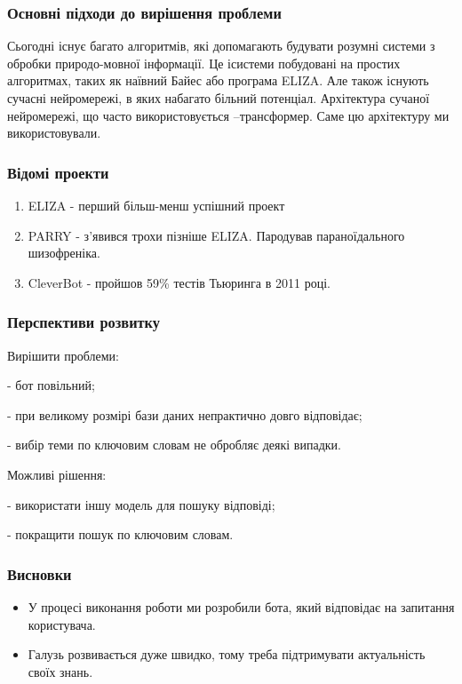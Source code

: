 \documentclass{beamer}
\begin{document}
\begin{frame}
    \frametitle{Основні підходи до вирішення проблеми}
    Сьогодні існує багато алгоритмів, які допомагають будувати розумні системи з обробки природо-мовної інформації. Це ісистеми побудовані на простих алгоритмах, таких як наївний Байес або програма ELIZA. Але також існують сучасні нейромережі, в яких набагато більний потенціал. Архітектура сучаної нейромережі, що часто використовується –трансформер. Саме цю архітектуру ми використовували.
\end{frame}

\begin{frame}
    \frametitle{Відомі проекти}
    \begin{enumerate}
        \item ELIZA - перший більш-менш успішний проект
        \item PARRY - з'явився трохи пізніше ELIZA. Пародував параноїдального шизофреніка.
        \item CleverBot - пройшов 59\% тестів Тьюринга в 2011 році.
    \end{enumerate}
\end{frame}

\begin{frame}
    \frametitle{Перспективи розвитку}
    Вирішити проблеми:

    - бот повільний;

    - при великому розмірі бази даних непрактично довго відповідає;

    - вибір теми по ключовим словам не обробляє деякі випадки.

    Можливі рішення:
    
    - використати іншу модель для пошуку відповіді;

    - покращити пошук по ключовим словам.
\end{frame}

\begin{frame}
    \frametitle{Висновки}

    \begin{itemize}
        \item У процесі виконання роботи ми розробили бота, який відповідає на запитання користувача.
        \item Галузь розвивається дуже швидко, тому треба підтримувати актуальність своїх знань.
    \end{itemize}
    
\end{frame}
\end{document}
